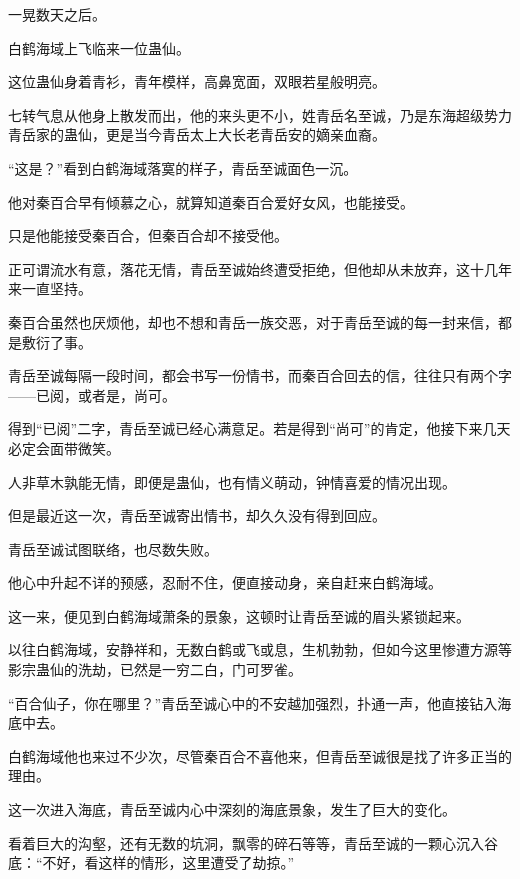 
\begin{this_body}



一晃数天之后。

白鹤海域上飞临来一位蛊仙。

这位蛊仙身着青衫，青年模样，高鼻宽面，双眼若星般明亮。

七转气息从他身上散发而出，他的来头更不小，姓青岳名至诚，乃是东海超级势力青岳家的蛊仙，更是当今青岳太上大长老青岳安的嫡亲血裔。

“这是？”看到白鹤海域落寞的样子，青岳至诚面色一沉。

他对秦百合早有倾慕之心，就算知道秦百合爱好女风，也能接受。

只是他能接受秦百合，但秦百合却不接受他。

正可谓流水有意，落花无情，青岳至诚始终遭受拒绝，但他却从未放弃，这十几年来一直坚持。

秦百合虽然也厌烦他，却也不想和青岳一族交恶，对于青岳至诚的每一封来信，都是敷衍了事。

青岳至诚每隔一段时间，都会书写一份情书，而秦百合回去的信，往往只有两个字——已阅，或者是，尚可。

得到“已阅”二字，青岳至诚已经心满意足。若是得到“尚可”的肯定，他接下来几天必定会面带微笑。

人非草木孰能无情，即便是蛊仙，也有情义萌动，钟情喜爱的情况出现。

但是最近这一次，青岳至诚寄出情书，却久久没有得到回应。

青岳至诚试图联络，也尽数失败。

他心中升起不详的预感，忍耐不住，便直接动身，亲自赶来白鹤海域。

这一来，便见到白鹤海域萧条的景象，这顿时让青岳至诚的眉头紧锁起来。

以往白鹤海域，安静祥和，无数白鹤或飞或息，生机勃勃，但如今这里惨遭方源等影宗蛊仙的洗劫，已然是一穷二白，门可罗雀。

“百合仙子，你在哪里？”青岳至诚心中的不安越加强烈，扑通一声，他直接钻入海底中去。

白鹤海域他也来过不少次，尽管秦百合不喜他来，但青岳至诚很是找了许多正当的理由。

这一次进入海底，青岳至诚内心中深刻的海底景象，发生了巨大的变化。

看着巨大的沟壑，还有无数的坑洞，飘零的碎石等等，青岳至诚的一颗心沉入谷底：“不好，看这样的情形，这里遭受了劫掠。”


\end{this_body}
